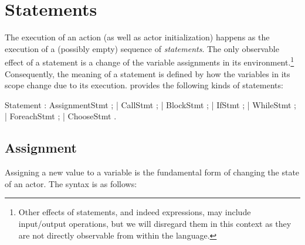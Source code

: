 

\chapter{Statements}\label{sect:Statements}


The execution of an action (as well as actor initialization) happens
as the execution of a (possibly empty) sequence of {\em statements}.
The only observable effect
of a statement is a change of the variable assignments in its
environment.\footnote{Other effects of statements, and indeed
  expressions, may include input/output operations, but we will
  disregard them in this context as they are not directly observable
  from within the language.} Consequently, the meaning of a statement is defined by
how the variables in its scope change due to its execution. \Cal
provides the following kinds of statements:


\bgr

Statement : AssignmentStmt ;
    | CallStmt ;
    | BlockStmt ;
    | IfStmt ;
    | WhileStmt ;
    | ForeachStmt ;
    | ChooseStmt .

\egr


\section{Assignment}\label{sect:Assignment}



Assigning a new value to a variable is the
fundamental form of changing the state of an actor. The syntax is as
follows:


